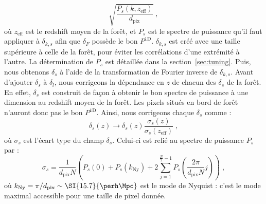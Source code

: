 \begin{equation}
  \sqrt{\frac{P_{s}(k,z_{\mathrm{eff}})}{d_{\mathrm{pix}}}} \; ,
\end{equation}
où $z_{\mathrm{eff}}$ est le redshift moyen de la forêt, et $P_{s}$ est le spectre de puissance qu'il faut appliquer à $\delta_{k,s}$ afin que $\delta_F$ possède le bon $P^{\mathrm{1D}}$. $\delta_{k,s}$ est créé avec une taille supérieure à celle de la forêt, pour éviter les corrélations d'une extrémité à l'autre. La détermination de $P_{s}$ est détaillée dans la section~\ref{sec:tuning}. Puis, nous obtenons $\delta_s$ à l'aide de la transformation de Fourier inverse de $\delta_{k,s}$.
  Avant d'ajouter $\delta_s$ à $\delta_l$, nous corrigeons la dépendance en $z$ de chacun des $\delta_s$ de la forêt. En effet, $\delta_s$ est construit de façon à obtenir le bon spectre de puissance à une dimension au redshift moyen de la forêt. Les pixels situés en bord de forêt n'auront donc pas le bon $P^{\mathrm{1D}}$. Ainsi, nous corrigeons chaque $\delta_s$ comme :
  \begin{equation}
    \delta_s(z) \rightarrow \delta_s(z) \frac{\sigma_s(z)}{\sigma_s(z_{\mathrm{eff}})} \; ,
  \end{equation}
  où $\sigma_s$ est l'écart type du champ $\delta_s$. Celui-ci est relié au spectre de puissance $P_{s}$ par :
  \begin{equation}
    \label{eq:sigma_s}
    \sigma_s = \frac{1}{d_{\mathrm{pix}}N} \left( P_{s}(0) + P_{s}(k_{\mathrm{Ny}}) + 2 \sum_{j=1}^{\frac{N}{2} - 1}P_{s}\left(\frac{2 \pi}{d_{\mathrm{pix}}N} j\right)\right) \; ,
  \end{equation}
  où $k_{\mathrm{Ny}} = \pi / d_{\mathrm{pix}} \sim \SI{15.7}{\perh\Mpc}$ est le mode de Nyquist : c'est le mode maximal accessible pour une taille de pixel donnée.


